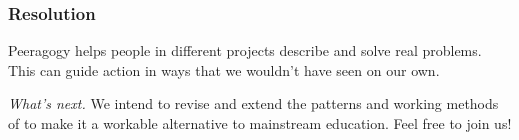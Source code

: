 \subsubsection*{Resolution}
Peeragogy helps people in different projects describe and solve real problems.  This can guide action in ways that we wouldn't have seen on our own.

\begin{framed}
\noindent \emph{What's next.}  We intend to revise and extend the patterns and working methods of
 to make it a workable alternative to mainstream education.  Feel free to join us!
\end{framed}


\endgroup

